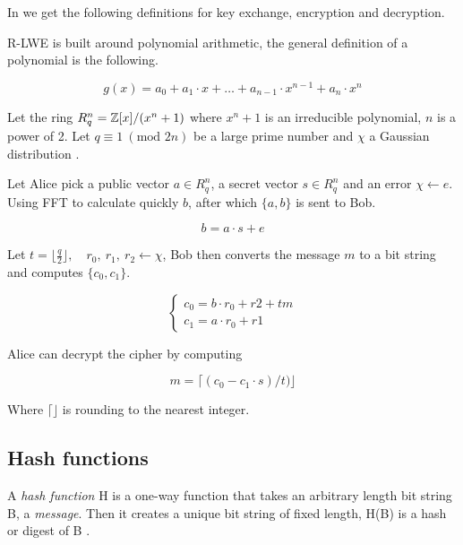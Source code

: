 In \citep{FPGA_Post_Quantum_Primitives} we get the following definitions for
key exchange, encryption and decryption.

\begin{definition}

    R-LWE is built around polynomial arithmetic, the general definition of a
    polynomial is the following.

    \[ g(x) = a_0 + a_1 \cdot x + \ldots + a_{n-1} \cdot x^{n-1} + a_n \cdot x^n \]

    Let the ring $R_q^n = \mathbb{Z}[x]/(x^n + 1)$ where $x^n + 1$ is an irreducible
    polynomial, $n$ is a power of 2. Let $q \equiv 1\ (\text{mod } 2n)$ be a
    large prime number and $\chi$ a Gaussian distribution
    \citep{FPGA_Post_Quantum_Primitives}.

    Let Alice pick a public vector $a \in R_q^n$, a secret vector $s \in R_q^n$
    and an error $\chi \leftarrow e$. Using FFT to calculate quickly $b$, after
    which $\{a,b\}$ is sent to Bob.

    \[b = a \cdot s + e \]

\end{definition}

\begin{definition}
    Let $t = \lfloor \frac{q}{2} \rfloor, \quad r_0,\ r_1,\ r_2
    \leftarrow \chi$, Bob then converts the message $m$ to a bit string and
    computes $\{c_0, c_1\}$.

    \[
        \begin{cases}
            c_0 = b \cdot r_0 + r2 + tm\\
            c_1 = a \cdot r_0 + r1
        \end{cases}
    \]

\end{definition}

\begin{definition}
    Alice can decrypt the cipher by computing

    \[m = \lceil (c_0 - c_1 \cdot s) / t) \rfloor \]

    Where $\lceil \rfloor$ is rounding to the nearest integer.
\end{definition}

\subsection{Hash functions}
\begin{definition}

A \textit{hash function} H is a one-way function that takes an arbitrary length
bit string B, a \textit{message}. Then it creates a unique bit string of fixed
length, H(B) is a hash or digest of B \cite{FranciscoRodriguez-Henriquez10}.

\end{definition}

